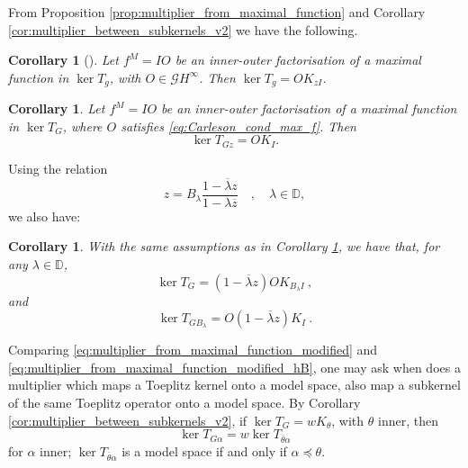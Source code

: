 \documentclass{article}
\numberwithin{equation}{section}
\theoremstyle{plain}
\newtheorem{cor}[thm]{Corollary}
\newcommand{\Hinf}{\ensuremath{H^\infty}}
\newcommand{\DD}{\ensuremath{\mathbb{D}}}
\newcommand{\GG}{\ensuremath{\mathcal{G}}}
\newcommand{\ol}[1]{\ensuremath{\overline{#1}}}
\newcommand{\kertg}{\ensuremath{\ker T_g}}
\begin{document}
From Proposition \ref{prop:multiplier_from_maximal_function} and Corollary \ref{cor:multiplier_between_subkernels_v2} we have the following.


\begin{cor}[{\cite[Corollary 3.17]{CCD25}}]
Let $f^M = IO$ be an inner-outer factorisation of a maximal function in \kertg, with $O\in\GG\Hinf$.
Then $\kertg = OK_{zI}$.
\end{cor}


\begin{cor}
\label{cor:multiplier_from_maximal_function_hz}
Let $f^M = IO$ be an inner-outer factorisation of a maximal function in $\ker T_G$, where $O$ satisfies \eqref{eq:Carleson_cond_max_f}.
Then 
\begin{equation}
\label{eq:multiplier_from_max_funct_hz}
\ker T_{Gz} = O K_I .
\end{equation}
\end{cor}


Using the relation
\begin{equation}
z= B_\lambda \frac{1-\ol\lambda z}{1-\lambda\ol z} \quad , \quad \lambda \in\DD,
\end{equation}
we also have:


\begin{cor}
\label{cor:multiplier_from_maximal_function_modified}
With the same assumptions as in Corollary \ref{cor:multiplier_from_maximal_function_hz}, we have that, for any $\lambda\in\DD$,
\begin{equation}
\label{eq:multiplier_from_maximal_function_modified}
\ker T_G = (1-\ol\lambda z) O K_{B_\lambda I}\ ,
\end{equation}
and
\begin{equation}
\label{eq:multiplier_from_maximal_function_modified_hB}
\ker T_{GB_\lambda} = O (1-\ol\lambda z) K_I\ .
\end{equation}
\end{cor}


Comparing \eqref{eq:multiplier_from_maximal_function_modified} and \eqref{eq:multiplier_from_maximal_function_modified_hB}, one may ask when does a multiplier which maps a Toeplitz kernel onto a model space, also map a subkernel of the same Toeplitz operator onto a model space.
By Corollary \ref{cor:multiplier_between_subkernels_v2}, if $\ker T_G = w K_\theta$, with $\theta$ inner, then
\begin{equation}
\label{eq:multiplier_Galpha_to_theta_alpha}
\ker T_{G \alpha} = w \ker T_{\ol\theta\alpha}
\end{equation}
for $\alpha$ inner;
$\ker T_{\ol\theta\alpha}$ is a model space if and only if $\alpha \preceq \theta$.
\end{document}
